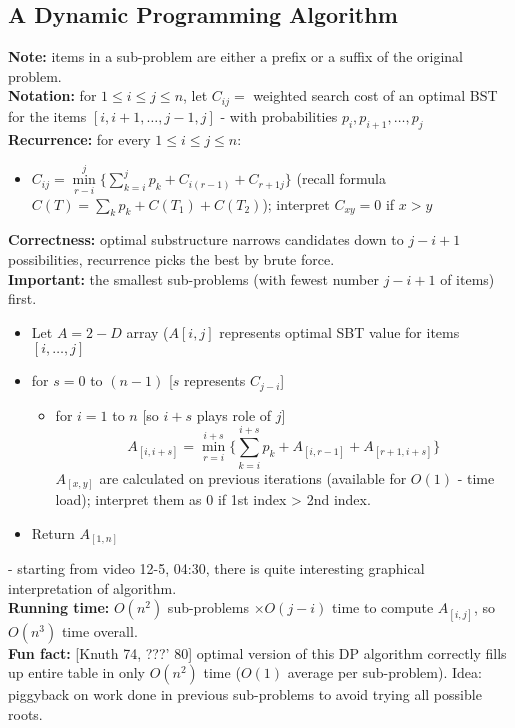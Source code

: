 \documentclass{scrartcl}
\begin{document}
\subsection{A Dynamic Programming Algorithm}
\label{sec:12-4} {\bf Note: } items in a sub-problem are either a prefix or a
suffix of the
original problem.\\
{\bf Notation: } for $1 \leq i \leq j \leq n$, let $C_{ij} = $ weighted search
cost of an optimal BST for the items $[i, i+1, \dots, j-1, j]$ - with
probabilities $p_i, p_{i+1}, \dots, p_j$\\
{\bf Recurrence: } for every $1 \leq i \leq j \leq n$:
\begin{itemize}
\item $C_{ij} = \min \limits_{r-i}^j \{\sum\limits_{k=i}^j p_k + C_{i (r-1)} +
  C_{r+1 j} \} $ (recall formula $C(T) = \sum \limits_k p_k + C(T_1) + C(T_2)$);
  interpret $C_{xy} = 0$ if $x > y$
\end{itemize} {\bf Correctness: } optimal substructure narrows candidates down
to $j -i + 1$
possibilities, recurrence picks the best by brute force.\\
{\bf Important: } the smallest sub-problems (with fewest number $j-i+1$ of
items) first.\\
\begin{itemize}
\item Let $A = 2-D$ array ($A[i,j]$ represents optimal SBT value for items $[i,
  \dots, j]$
\item for $s = 0$ to $(n-1)$ [$s$ represents $C_{j-i}$]
  \begin{itemize}
  \item for $i = 1$ to $n$ [so $i+s$ plays role of $j$]
    $$A_{[i, i+s]} = \min_{r=i}^{i+s} \{\sum_{k=i}^{i+s}p_k + A_{[i, r-1]} +
    A_{[r+1, i+s]}\}$$ $A_{[x, y]}$ are calculated on previous iterations
    (available for $O(1)$ - time load); interpret them as $0$ if 1st index > 2nd
    index.
  \end{itemize}
\item Return $A_{[1, n]}$
\end{itemize}
- starting from video 12-5, 04:30, there is quite interesting graphical
interpretation of algorithm.\\
{\bf Running time: } $O(n^2)$ sub-problems $\times O(j-i)$ time to compute
$A_{[i, j]}$, so $O(n^3)$ time overall.\\
{\bf Fun fact: } [Knuth 74, ???' 80] optimal version of this DP algorithm
correctly fills up entire table in only $O(n^2)$ time ($O(1)$ average per
sub-problem). Idea: piggyback on work done in previous sub-problems to avoid
trying all possible roots.
\end{document}
